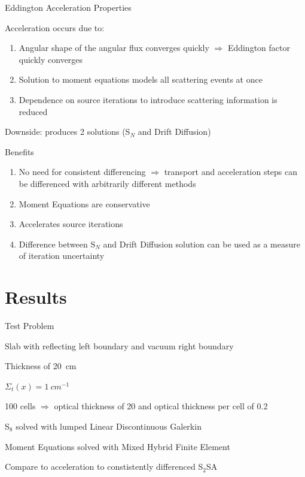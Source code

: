 \documentclass[10pt]{beamer}
\newcommand{\SN}{S$_N$\xspace}
\begin{document}
\begin{frame}{Eddington Acceleration Properties}
    
    \onslide<+->
    Acceleration occurs due to: 
    \begin{enumerate}
    	\item Angular shape of the angular flux converges quickly $\Rightarrow$ Eddington factor quickly converges 

    	\item Solution to moment equations models all scattering events at once 

    	\item Dependence on source iterations to introduce scattering information is reduced

    \end{enumerate}

    \onslide<+->
    Downside: produces 2 solutions (\SN and Drift Diffusion)

    \onslide<+->
    Benefits 
    \begin{enumerate}
    	\item No need for consistent differencing $\Rightarrow$ transport and acceleration steps can be differenced with arbitrarily different methods 

        \item Moment Equations are conservative 

        \item Accelerates source iterations 

        \item Difference between \SN and Drift Diffusion solution can be used as a measure of iteration uncertainty 

    \end{enumerate}

\end{frame}

\section{Results}

\begin{frame}{Test Problem} 

	Slab with reflecting left boundary and vacuum right boundary 

    Thickness of \SI{20}{cm} 

    $\Sigma_t(x) = \SI{1}{cm^{-1}}$

    100 cells $\Rightarrow$ optical thickness of 20 and optical thickness per cell of 0.2 

    S$_8$ solved with lumped Linear Discontinuous Galerkin 

    Moment Equations solved with Mixed Hybrid Finite Element 

    Compare to acceleration to constistently differenced S$_2$SA 

\end{frame}
\end{document}
